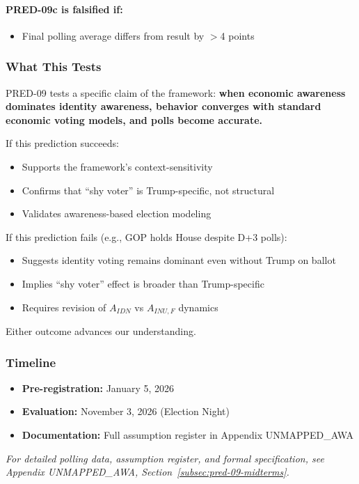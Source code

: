 \paragraph{PRED-09c is falsified if:}
\begin{itemize}
    \item Final polling average differs from result by $>$4 points
\end{itemize}

\subsubsection{What This Tests}

PRED-09 tests a specific claim of the framework: \textbf{when economic 
awareness dominates identity awareness, behavior converges with 
standard economic voting models, and polls become accurate.}

If this prediction succeeds:
\begin{itemize}
    \item Supports the framework's context-sensitivity
    \item Confirms that ``shy voter'' is Trump-specific, not structural
    \item Validates awareness-based election modeling
\end{itemize}

If this prediction fails (e.g., GOP holds House despite D+3 polls):
\begin{itemize}
    \item Suggests identity voting remains dominant even without Trump on ballot
    \item Implies ``shy voter'' effect is broader than Trump-specific
    \item Requires revision of $A_{IDN}$ vs $A_{INU,F}$ dynamics
\end{itemize}

Either outcome advances our understanding.

\subsubsection{Timeline}

\begin{itemize}
    \item \textbf{Pre-registration:} January 5, 2026
    \item \textbf{Evaluation:} November 3, 2026 (Election Night)
    \item \textbf{Documentation:} Full assumption register in Appendix UNMAPPED_AWA
\end{itemize}

\vspace{1em}
\noindent\textit{For detailed polling data, assumption register, and formal 
specification, see Appendix UNMAPPED_AWA, Section~\ref{subsec:pred-09-midterms}.}

